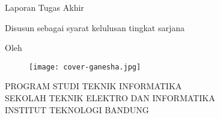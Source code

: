 \pagestyle{empty}

\begin{center}
\smallskip

    \Large \bfseries \MakeUppercase{\thetitle}
    \vfill

    \Large Laporan Tugas Akhir
    \vfill

    \large Disusun sebagai syarat kelulusan tingkat sarjana
    \vfill

    \large Oleh

    \Large \uppercase{\theauthor}

    \vfill
    \begin{figure}[h]
        \centering
      	\texttt{[image: cover-ganesha.jpg]}
    \end{figure}
    \vfill

    \large
    \uppercase{Program Studi Teknik Informatika \\
        Sekolah Teknik Elektro dan Informatika \\
        Institut Teknologi Bandung}

    \thedate

\end{center}